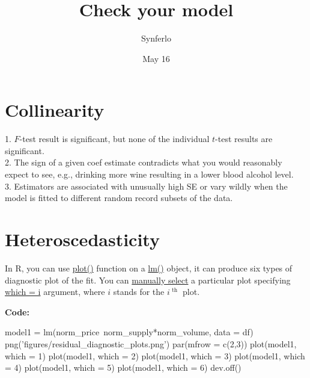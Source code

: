\documentclass[12pt]{article}
\title{Check your model}
\author{Synferlo}
\date{May 16}
\begin{document}
\maketitle
\newpage



\section{Collinearity}
1. $ F $-test result is significant, but none of the individual
$ t $-test results are significant.\\

2. The sign of a given coef estimate contradicts what you would 
reasonably expect to see, e.g., drinking more wine resulting in a 
lower blood alcohol level.\\

3. Estimators are associated with unusually high SE or vary wildly when
the model is fitted to different random record subsets of the data.\\







\section{Heteroscedasticity}


In R, you can use {\underline {plot()}} function on a 
{\underline {lm()}} object, it can produce six types of diagnostic
plot of the fit. You can {\underline {manually select}} a particular
plot specifying {\underline {which = i}} argument, where $ i $ stands
for the $ i^{\text{ th }} $ plot.


{\textbf {Code:}}
\begin{rc}
model1 = lm(norm_price~norm_supply*norm_volume, data = df)
png('figures/residual_diagnostic_plots.png')
par(mfrow = c(2,3))
plot(model1, which = 1)
plot(model1, which = 2)
plot(model1, which = 3)
plot(model1, which = 4)
plot(model1, which = 5)
plot(model1, which = 6)
dev.off()
\end{rc}

\begin{figure}[H]
\end{figure}
\end{document}
